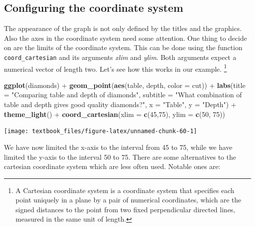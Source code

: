 \documentclass[]{tufte-book}
\newenvironment{Shaded}{}{}
\newcommand{\DataTypeTok}[1]{\textcolor[rgb]{0.56,0.13,0.00}{#1}}
\newcommand{\DecValTok}[1]{\textcolor[rgb]{0.25,0.63,0.44}{#1}}
\newcommand{\KeywordTok}[1]{\textcolor[rgb]{0.00,0.44,0.13}{\textbf{#1}}}
\newcommand{\NormalTok}[1]{#1}
\newcommand{\OperatorTok}[1]{\textcolor[rgb]{0.40,0.40,0.40}{#1}}
\newcommand{\StringTok}[1]{\textcolor[rgb]{0.25,0.44,0.63}{#1}}
\begin{document}
\hypertarget{configuring-the-coordinate-system}{%
\subsection{Configuring the coordinate system}\label{configuring-the-coordinate-system}}

The appearance of the graph is not only defined by the titles and the graphics. Also the axes in the coordinate system need some attention. One thing to decide on are the limits of the coordinate system. This can be done using the function \texttt{coord\_cartesian} and its arguments \emph{xlim} and \emph{ylim}. Both arguments expect a numerical vector of length two. Let's see how this works in our example. \footnote{A Cartesian coordinate system is a coordinate system that specifies each point uniquely in a plane by a pair of numerical coordinates, which are the signed distances to the point from two fixed perpendicular directed lines, measured in the same unit of length.}

\begin{Shaded}
\begin{Highlighting}[]
\KeywordTok{ggplot}\NormalTok{(diamonds) }\OperatorTok{+}
\StringTok{    }\KeywordTok{geom_point}\NormalTok{(}\KeywordTok{aes}\NormalTok{(table, depth, }\DataTypeTok{color =}\NormalTok{ cut)) }\OperatorTok{+}\StringTok{ }
\StringTok{    }\KeywordTok{labs}\NormalTok{(}\DataTypeTok{title =} \StringTok{"Comparing table and depth of diamonds"}\NormalTok{,}
         \DataTypeTok{subtitle =} \StringTok{"What combination of table and depth gives good quality diamonds?"}\NormalTok{,}
         \DataTypeTok{x =} \StringTok{"Table"}\NormalTok{,}
         \DataTypeTok{y =} \StringTok{"Depth"}\NormalTok{) }\OperatorTok{+}
\StringTok{    }\KeywordTok{theme_light}\NormalTok{() }\OperatorTok{+}
\StringTok{    }\KeywordTok{coord_cartesian}\NormalTok{(}\DataTypeTok{xlim =} \KeywordTok{c}\NormalTok{(}\DecValTok{45}\NormalTok{,}\DecValTok{75}\NormalTok{), }\DataTypeTok{ylim =} \KeywordTok{c}\NormalTok{(}\DecValTok{50}\NormalTok{, }\DecValTok{75}\NormalTok{))}
\end{Highlighting}
\end{Shaded}

\texttt{[image: textbook\_files/figure-latex/unnamed-chunk-60-1]}

We have now limited the x-axis to the interval from 45 to 75, while we have limited the y-axis to the interval 50 to 75. There are some alternatives to the cartesian coordinate system which are less often used. Notable ones are:
\end{document}

